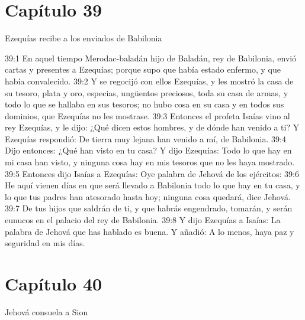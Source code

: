 \section*{Capítulo 39 }
Ezequías recibe a los enviados de Babilonia 

 
39:1 En aquel tiempo Merodac-baladán hijo de Baladán, rey de Babilonia, envió cartas y presentes a Ezequías; porque supo que había estado enfermo, y que había convalecido. 
39:2 Y se regocijó con ellos Ezequías, y les mostró la casa de su tesoro, plata y oro, especias, ungüentos preciosos, toda su casa de armas, y todo lo que se hallaba en sus tesoros; no hubo cosa en su casa y en todos sus dominios, que Ezequías no les mostrase. 
39:3 Entonces el profeta Isaías vino al rey Ezequías, y le dijo: ¿Qué dicen estos hombres, y de dónde han venido a ti? Y Ezequías respondió: De tierra muy lejana han venido a mí, de Babilonia. 
39:4 Dijo entonces: ¿Qué han visto en tu casa? Y dijo Ezequías: Todo lo que hay en mi casa han visto, y ninguna cosa hay en mis tesoros que no les haya mostrado. 
39:5 Entonces dijo Isaías a Ezequías: Oye palabra de Jehová de los ejércitos: 
39:6 He aquí vienen días en que será llevado a Babilonia todo lo que hay en tu casa, y lo que tus padres han atesorado hasta hoy; ninguna cosa quedará, dice Jehová. 
39:7 De tus hijos que saldrán de ti, y que habrás engendrado, tomarán, y serán eunucos en el palacio del rey de Babilonia. 
39:8 Y dijo Ezequías a Isaías: La palabra de Jehová que has hablado es buena. Y añadió: A lo menos, haya paz y seguridad en mis días. 
\section*{Capítulo 40 }
Jehová consuela a Sion 
 
